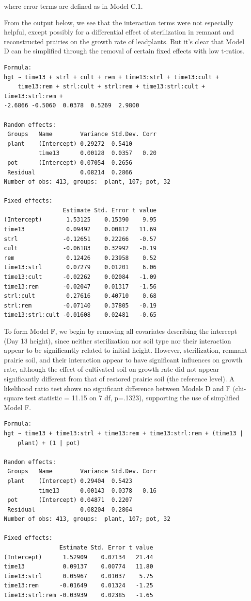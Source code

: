 \documentclass[
]{krantz}
\begin{document}
where error terms are defined as in Model C.1.

From the output below, we see that the interaction terms were not especially helpful, except possibly for a differential effect of sterilization in remnant and reconstructed prairies on the growth rate of leadplants. But it's clear that Model D can be simplified through the removal of certain fixed effects with low t-ratios.

\begin{verbatim}
Formula: 
hgt ~ time13 + strl + cult + rem + time13:strl + time13:cult +  
    time13:rem + strl:cult + strl:rem + time13:strl:cult + time13:strl:rem +  
-2.6866 -0.5060  0.0378  0.5269  2.9800 

Random effects:
 Groups   Name        Variance Std.Dev. Corr
 plant    (Intercept) 0.29272  0.5410       
          time13      0.00128  0.0357   0.20
 pot      (Intercept) 0.07054  0.2656       
 Residual             0.08214  0.2866       
Number of obs: 413, groups:  plant, 107; pot, 32

Fixed effects:
                 Estimate Std. Error t value
(Intercept)       1.53125    0.15390    9.95
time13            0.09492    0.00812   11.69
strl             -0.12651    0.22266   -0.57
cult             -0.06183    0.32992   -0.19
rem               0.12426    0.23958    0.52
time13:strl       0.07279    0.01201    6.06
time13:cult      -0.02262    0.02084   -1.09
time13:rem       -0.02047    0.01317   -1.56
strl:cult         0.27616    0.40710    0.68
strl:rem         -0.07140    0.37805   -0.19
time13:strl:cult -0.01608    0.02481   -0.65
\end{verbatim}

To form Model F, we begin by removing all covariates describing the intercept (Day 13 height), since neither sterilization nor soil type nor their interaction appear to be significantly related to initial height. However, sterilization, remnant prairie soil, and their interaction appear to have significant influences on growth rate, although the effect of cultivated soil on growth rate did not appear significantly different from that of restored prairie soil (the reference level). A likelihood ratio test shows no significant difference between Models D and F (chi-square test statistic = 11.15 on 7 df, p=.1323), supporting the use of simplified Model F.

\begin{verbatim}
Formula: 
hgt ~ time13 + time13:strl + time13:rem + time13:strl:rem + (time13 |  
    plant) + (1 | pot)

Random effects:
 Groups   Name        Variance Std.Dev. Corr
 plant    (Intercept) 0.29404  0.5423       
          time13      0.00143  0.0378   0.16
 pot      (Intercept) 0.04871  0.2207       
 Residual             0.08204  0.2864       
Number of obs: 413, groups:  plant, 107; pot, 32

Fixed effects:
                Estimate Std. Error t value
(Intercept)      1.52909    0.07134   21.44
time13           0.09137    0.00774   11.80
time13:strl      0.05967    0.01037    5.75
time13:rem      -0.01649    0.01324   -1.25
time13:strl:rem -0.03939    0.02385   -1.65
\end{verbatim}
\end{document}
